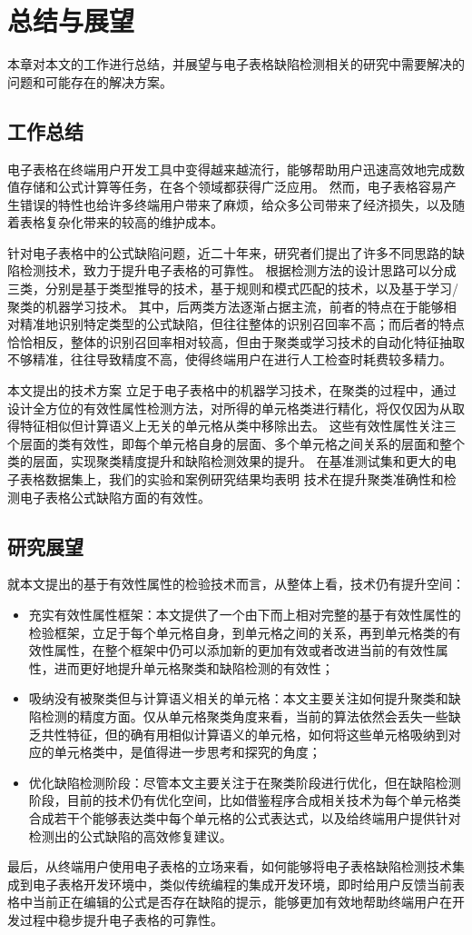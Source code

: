 \chapter{总结与展望}
本章对本文的工作进行总结，并展望与电子表格缺陷检测相关的研究中需要解决的问题和可能存在的解决方案。


\section{工作总结}
电子表格在终端用户开发工具中变得越来越流行，能够帮助用户迅速高效地完成数值存储和公式计算等任务，在各个领域都获得广泛应用。
然而，电子表格容易产生错误的特性也给许多终端用户带来了麻烦，给众多公司带来了经济损失，以及随着表格复杂化带来的较高的维护成本。

针对电子表格中的公式缺陷问题，近二十年来，研究者们提出了许多不同思路的缺陷检测技术，致力于提升电子表格的可靠性。
根据检测方法的设计思路可以分成三类，分别是基于类型推导的技术，基于规则和模式匹配的技术，以及基于学习/聚类的机器学习技术。
其中，后两类方法逐渐占据主流，前者的特点在于能够相对精准地识别特定类型的公式缺陷，但往往整体的识别召回率不高；而后者的特点恰恰相反，整体的识别召回率相对较高，但由于聚类或学习技术的自动化特征抽取不够精准，往往导致精度不高，使得终端用户在进行人工检查时耗费较多精力。

本文提出的技术方案 \wa 立足于电子表格中的机器学习技术\cu，在聚类的过程中，通过设计全方位的有效性属性检测方法，对所得的单元格类进行精化，将仅仅因为从取得特征相似但计算语义上无关的单元格从类中移除出去。
这些有效性属性关注三个层面的类有效性，即每个单元格自身的层面、多个单元格之间关系的层面和整个类的层面，实现聚类精度提升和缺陷检测效果的提升。
在基准测试集和更大的电子表格数据集上，我们的实验和案例研究结果均表明 \wa 技术在提升聚类准确性和检测电子表格公式缺陷方面的有效性。


\section{研究展望}
就本文提出的基于有效性属性的检验技术而言，从整体上看，\wa 技术仍有提升空间：
\begin{itemize}
    \item 充实有效性属性框架：本文提供了一个由下而上相对完整的基于有效性属性的检验框架，立足于每个单元格自身，到单元格之间的关系，再到单元格类的有效性属性，在整个框架中仍可以添加新的更加有效或者改进当前的有效性属性，进而更好地提升单元格聚类和缺陷检测的有效性；
    \item 吸纳没有被聚类但与计算语义相关的单元格：本文主要关注如何提升聚类和缺陷检测的精度方面。仅从单元格聚类角度来看，当前的算法依然会丢失一些缺乏共性特征，但的确有用相似计算语义的单元格，如何将这些单元格吸纳到对应的单元格类中，是值得进一步思考和探究的角度；
    \item 优化缺陷检测阶段：尽管本文主要关注于在聚类阶段进行优化，但在缺陷检测阶段，目前的技术仍有优化空间，比如借鉴程序合成相关技术为每个单元格类合成若干个能够表达类中每个单元格的公式表达式，以及给终端用户提供针对检测出的公式缺陷的高效修复建议。
\end{itemize}

最后，从终端用户使用电子表格的立场来看，如何能够将电子表格缺陷检测技术集成到电子表格开发环境中，类似传统编程的集成开发环境，即时给用户反馈当前表格中当前正在编辑的公式是否存在缺陷的提示，能够更加有效地帮助终端用户在开发过程中稳步提升电子表格的可靠性。
